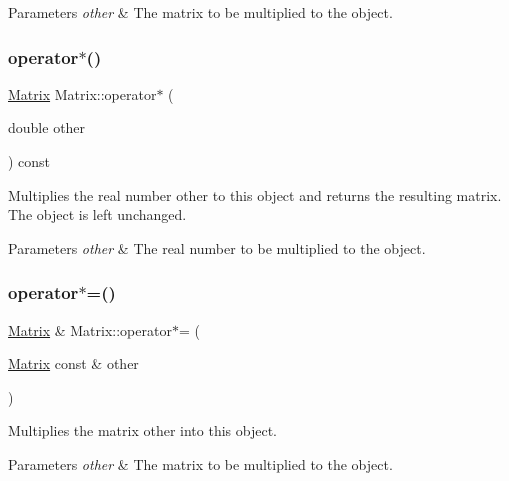\begin{DoxyParams}{Parameters}
{\em other} & The matrix to be multiplied to the object. \\
\hline
\end{DoxyParams}
\mbox{\label{classMatrix_afdd6cdea30961d5ce34be67332c1d0dd}} 
\subsubsection{\texorpdfstring{operator$\ast$()}{operator*()}\hspace{0.1cm}{\footnotesize\ttfamily [2/2]}}
{\footnotesize\ttfamily \hyperlink{classMatrix}{Matrix} Matrix\+::operator$\ast$ (\begin{DoxyParamCaption}\item[{double}]{other }\end{DoxyParamCaption}) const}

Multiplies the real number {\ttfamily other} to this object and returns the resulting matrix. The object is left unchanged.


\begin{DoxyParams}{Parameters}
{\em other} & The real number to be multiplied to the object. \\
\hline
\end{DoxyParams}
\mbox{\label{classMatrix_a8d3c514ae15700397053fd3402552b1c}} 
\subsubsection{\texorpdfstring{operator$\ast$=()}{operator*=()}\hspace{0.1cm}{\footnotesize\ttfamily [1/2]}}
{\footnotesize\ttfamily \hyperlink{classMatrix}{Matrix} \& Matrix\+::operator$\ast$= (\begin{DoxyParamCaption}\item[{\hyperlink{classMatrix}{Matrix} const \&}]{other }\end{DoxyParamCaption})}

Multiplies the matrix {\ttfamily other} into this object.


\begin{DoxyParams}{Parameters}
{\em other} & The matrix to be multiplied to the object. \\
\hline
\end{DoxyParams}
\mbox{\label{classMatrix_ad2fd5772e288eb07a404907e6e1a1dd6}} 
